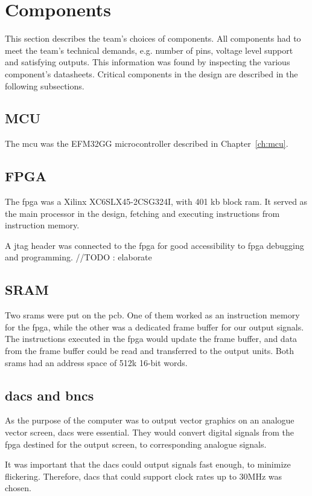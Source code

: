 \section{Components}
This section describes the team's choices of components.
All components had to meet the team's technical demands, e.g. number of pins, voltage level support and satisfying outputs.
This information was found by inspecting the various component's datasheets.
Critical components in the design are described in the following subsections.

\subsection{MCU}
The \gls{mcu} was the EFM32GG microcontroller described in Chapter~\ref{ch:mcu}.

\subsection{FPGA}
The \gls{fpga} was a Xilinx XC6SLX45-2CSG324I, with 401 kb block \gls{ram}.
It served as the main processor in the design, fetching and executing instructions from instruction memory.

A \gls{jtag} header was connected to the \gls{fpga} for good accessibility to \gls{fpga} debugging and programming.
//TODO : elaborate

\subsection{SRAM}
Two \gls{sram}s were put on the \gls{pcb}.
One of them worked as an instruction memory for the \gls{fpga}, while the other was a dedicated frame buffer for our output signals.
The instructions executed in the \gls{fpga} would update the frame buffer, and data from the frame buffer could be read and transferred to the output units.
Both \gls{sram}s had an address space of 512k 16-bit words.

\subsection{\gls{dac}s and \gls{bnc}s}
As the purpose of the computer was to output vector graphics on an analogue vector screen, \gls{dac}s were essential.
They would convert digital signals from the \gls{fpga} destined for the output screen, to corresponding analogue signals.

It was important that the \gls{dac}s could output signals fast enough, to minimize flickering.
Therefore, \gls{dac}s that could support clock rates up to 30MHz was chosen.

